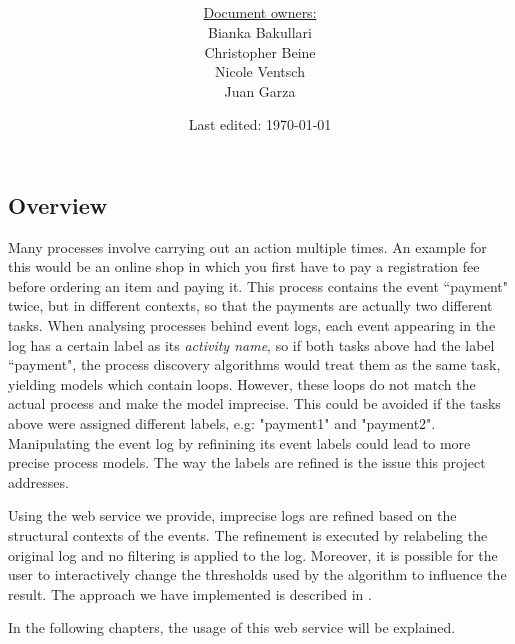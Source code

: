 \documentclass[notitlepage]{article}
\title{%
	\documentName\text{ } \\
  \large \projectName\text{ } \\
  }
\author{
	\large \underline{Document owners:}\\ 
	Bianka Bakullari\\
	\texttt{}
	Christopher Beine\\
	\texttt{}
	Nicole Ventsch\\
	\texttt{}
	Juan Garza\\
	\texttt{}
}
\date{\small{Last edited: \today}}
\begin{document}
\begin{titlepage}
\clearpage\maketitle			%
\thispagestyle{fancy}
\tableofcontents
\end{titlepage}

\rfoot{\thepage}				%


\begin{flushleft}				%

\section{Overview}

Many processes involve carrying out an action multiple times. 
An example for this would be an online shop in which you first have to pay a registration fee before ordering an item and paying it. 
This process contains the event “payment" twice, but in different contexts, so that the payments are actually two different tasks. 
When analysing processes behind event logs, each event appearing in the log has a certain label as its \textit{activity name}, so if both tasks above had the label “payment", the process discovery algorithms would treat them as the same task, yielding models which contain loops. 
However, these loops do not match the actual process and make the model imprecise.
This could be avoided if the tasks above were assigned different labels, e.g: "payment1" and "payment2".
Manipulating the event log by refinining its event labels could lead to more precise process models. 
The way the labels are refined is the issue this project addresses.

Using the web service we provide, imprecise logs are refined based on the structural contexts of the events. 
The refinement is executed by relabeling the original log and no filtering is applied to the log. 
Moreover, it is possible for the user to interactively change the thresholds used by the algorithm to influence the result. 
The approach we have implemented is described in \cite{paper}.

In the following chapters, the usage of this web service will be explained.



\end{flushleft}
\end{document}
